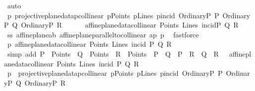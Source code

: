 \begin{isabellebody}
\ auto\isanewline
\ \ \isamarkupfalse%
\ p{}{}{\isacharcolon}{\kern0pt}\ {\isachardoublequoteopen}{\isacharparenleft}{\kern0pt}projective{\isacharunderscore}{\kern0pt}plane{\isacharunderscore}{\kern0pt}data{}{\isachardot}{\kern0pt}pcollinear\ pPoints\ pLines\ pincid\ {\isacharparenleft}{\kern0pt}OrdinaryP\ P{\isacharparenright}{\kern0pt}\ {\isacharparenleft}{\kern0pt}OrdinaryP\ Q{\isacharparenright}{\kern0pt}\ {\isacharparenleft}{\kern0pt}OrdinaryP\ R{\isacharparenright}{\kern0pt}{\isacharparenright}{\kern0pt}\ {\isasymLongrightarrow}\ \isanewline
\ \ \ \ {\isacharparenleft}{\kern0pt}affine{\isacharunderscore}{\kern0pt}plane{\isacharunderscore}{\kern0pt}data{\isachardot}{\kern0pt}collinear\ Points\ Lines\ {\isacharparenleft}{\kern0pt}incid{\isacharparenright}{\kern0pt}P\ Q\ R{\isacharparenright}{\kern0pt}{\isachardoublequoteclose}\ \isanewline
\ \ \isamarkupfalse%
\ ss\ affine{\isacharunderscore}{\kern0pt}plane{\isachardot}{\kern0pt}a{}b\ affine{\isacharunderscore}{\kern0pt}plane{\isachardot}{\kern0pt}parallel{\isacharunderscore}{\kern0pt}to{\isacharunderscore}{\kern0pt}collinear\ ap\ p{}{}\ \isamarkupfalse%
\ fastforce\isanewline
\isanewline
\ \ \isamarkupfalse%
\ p{}{}{\isacharcolon}{\kern0pt}\ {\isachardoublequoteopen}{\isasymnot}{\isacharparenleft}{\kern0pt}affine{\isacharunderscore}{\kern0pt}plane{\isacharunderscore}{\kern0pt}data{\isachardot}{\kern0pt}collinear\ Points\ Lines\ {\isacharparenleft}{\kern0pt}incid{\isacharparenright}{\kern0pt}\ P\ Q\ R{\isacharparenright}{\kern0pt}{\isachardoublequoteclose}\ \isanewline
\ \ \ \ \isamarkupfalse%
\ {\isacharparenleft}{\kern0pt}simp\ add{\isacharcolon}{\kern0pt}\ {\isacartoucheopen}P\ {\isasymin}\ Points\ {\isasymand}\ Q\ {\isasymin}\ Points\ {\isasymand}\ R\ {\isasymin}\ Points\ {\isasymand}\ P\ {\isasymnoteq}\ Q\ {\isasymand}\ P\ {\isasymnoteq}\ R\ {\isasymand}\ Q\ {\isasymnoteq}\ R\ {\isasymand}\ {\isasymnot}\ affine{\isacharunderscore}{\kern0pt}plane{\isacharunderscore}{\kern0pt}data{\isachardot}{\kern0pt}collinear\ Points\ Lines\ incid\ P\ Q\ R{\isacartoucheclose}{\isacharparenright}{\kern0pt}\isanewline
\ \ \isamarkupfalse%
\ p{}{}{\isacharcolon}{\kern0pt}\ {\isachardoublequoteopen}{\isasymnot}\ {\isacharparenleft}{\kern0pt}projective{\isacharunderscore}{\kern0pt}plane{\isacharunderscore}{\kern0pt}data{}{\isachardot}{\kern0pt}pcollinear\ pPoints\ pLines\ pincid\ {\isacharparenleft}{\kern0pt}OrdinaryP\ P{\isacharparenright}{\kern0pt}\ {\isacharparenleft}{\kern0pt}OrdinaryP\ Q{\isacharparenright}{\kern0pt}\ {\isacharparenleft}{\kern0pt}OrdinaryP\ R{\isacharparenright}{\kern0pt}{\isacharparenright}{\kern0pt}{\isachardoublequoteclose}\ \isamarkupfalse%

\end{isabellebody}
